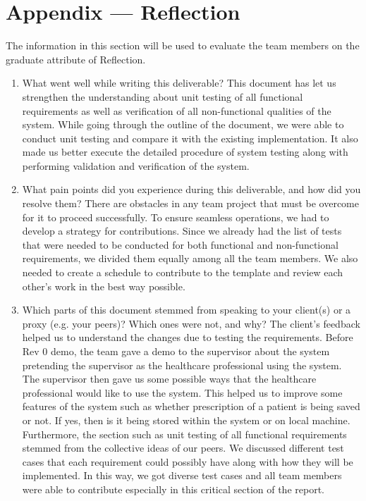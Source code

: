 \documentclass[12pt, titlepage]{article}
\begin{document}



\newpage{}
\section*{Appendix --- Reflection}

The information in this section will be used to evaluate the team members on the
graduate attribute of Reflection.



\begin{enumerate}
  \item What went well while writing this deliverable?
  This document has let us strengthen the understanding about unit testing of all functional requirements as well as verification of all non-functional qualities of the system. While going through the outline of the document, we were able to conduct unit testing and compare it with the existing implementation. It also made us better execute the detailed procedure of system testing along with performing validation and verification of the system. 

  \item What pain points did you experience during this deliverable, and how did you resolve them?
  There are obstacles in any team project that must be overcome for it to proceed successfully. To ensure seamless operations, we had to develop a strategy for contributions. Since we already had the list of tests that were needed to be conducted for both functional and non-functional requirements, we divided them equally among all the team members. We also needed to create a schedule to contribute to the template and review each other's work in the best way possible. 

  \item Which parts of this document stemmed from speaking to your client(s) or a proxy (e.g. your peers)? Which ones were not, and why?
  The client's feedback helped us to understand the changes due to testing the requirements. Before Rev 0 demo, the team gave a demo to the supervisor about the system pretending the supervisor as the healthcare professional using the system. The supervisor then gave us some possible ways that the healthcare professional would like to use the system. This helped us to improve some features of the system such as whether prescription of a patient is being saved or not. If yes, then is it being stored within the system or on local machine. Furthermore, the section such as unit testing of all functional requirements stemmed from the collective ideas of our peers. We discussed different test cases that each requirement could possibly have along with how they will be implemented. In this way, we got diverse test cases and all team members were able to contribute especially in this critical section of the report.


\end{enumerate}
\end{document}
